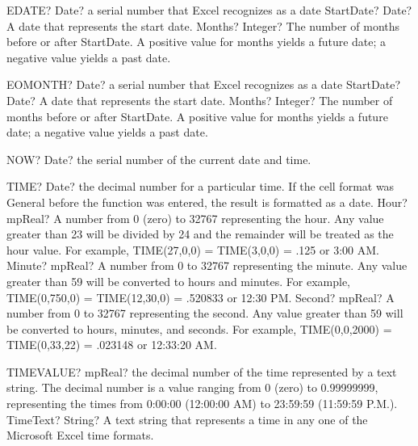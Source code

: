\documentclass[12pt,a4paper,openany]{book}
\begin{document}
\begin{mpFunctionsExtract}
\mpWorksheetFunctionTwoNotImplemented
{EDATE? Date? a serial number that Excel recognizes as a date}
{StartDate? Date? A date that represents the start date.}
{Months? Integer? The number of months before or after StartDate. A positive value for months yields a future date; a negative value yields a past date.}
\end{mpFunctionsExtract}

\begin{mpFunctionsExtract}
\mpWorksheetFunctionTwoNotImplemented
{EOMONTH? Date? a serial number that Excel recognizes as a date}
{StartDate? Date? A date that represents the start date.}
{Months? Integer? The number of months before or after StartDate. A positive value for months yields a future date; a negative value yields a past date.}
\end{mpFunctionsExtract}

\begin{mpFunctionsExtract}
\mpWorksheetFunctionZeroNotImplemented
{NOW? Date? the serial number of the current date and time.}
\end{mpFunctionsExtract}

\begin{mpFunctionsExtract}
\mpWorksheetFunctionThreeNotImplemented
{TIME? Date? the decimal number for a particular time. If the cell format was General before the function was entered, the result is formatted as a date.}
{Hour? mpReal? A number from 0 (zero) to 32767 representing the hour. Any value greater than 23 will be divided by 24 and the remainder will be treated as the hour value. For example, TIME(27,0,0) = TIME(3,0,0) = .125 or 3:00 AM.}
{Minute? mpReal? A number from 0 to 32767 representing the minute. Any value greater than 59 will be converted to hours and minutes. For example, TIME(0,750,0) = TIME(12,30,0) = .520833 or 12:30 PM.}
{Second? mpReal? A number from 0 to 32767 representing the second. Any value greater than 59 will be converted to hours, minutes, and seconds. For example, TIME(0,0,2000) = TIME(0,33,22) = .023148 or 12:33:20 AM.}
\end{mpFunctionsExtract}

\begin{mpFunctionsExtract}
\mpWorksheetFunctionOneNotImplemented
{TIMEVALUE? mpReal? the decimal number of the time represented by a text string. The decimal number is a value ranging from 0 (zero) to 0.99999999, representing the times from 0:00:00 (12:00:00 AM) to 23:59:59 (11:59:59 P.M.).}
{TimeText? String? A text string that represents a time in any one of the Microsoft Excel time formats.}
\end{mpFunctionsExtract}
\end{document}
